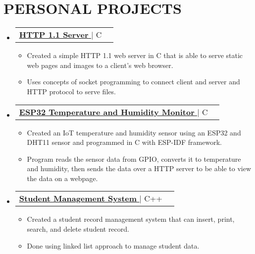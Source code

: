 \documentclass[letterpaper,11pt]{article}
\makeatletter
\newcommand{\resumeItem}[1]{
  \item\small{
    {#1 \vspace{-2pt}}
  }
}
\newcommand{\resumeProjectHeading}[2]{
    \item
    \begin{tabular*}{1.001\textwidth}{l@{\extracolsep{\fill}}r}
      \small#1 & \textbf{\small #2}\\
    \end{tabular*}\vspace{-7pt}
}
\newcommand{\resumeSubHeadingListStart}{\begin{itemize}[leftmargin=0.0in, label={}]}
\newcommand{\resumeSubHeadingListEnd}{\end{itemize}}
\newcommand{\resumeItemListStart}{\begin{itemize}}
\newcommand{\resumeItemListEnd}{\end{itemize}\vspace{-5pt}}
\makeatother
\begin{document}
\section{PERSONAL PROJECTS}
    \resumeSubHeadingListStart
      \resumeProjectHeading
        {\href{https://github.com/jamesyoung-15/http-server}{\textbf{\large{\underline{HTTP 1.1 Server}}} \href{Project Link}{\raisebox{-0.1\height}\faExternalLink }} $|$ \large{{C}}}{}
        \resumeItemListStart
        \vspace{3pt}
          \resumeItem{\normalsize{Created a simple HTTP 1.1 web server in C that is able to serve static web pages and images to a client's web browser.}}
          \resumeItem{\normalsize{Uses concepts of socket programming to connect client and server and HTTP protocol to serve files.}}
          \resumeItemListEnd
      
      \resumeProjectHeading
      {\href{https://github.com/jamesyoung-15/esp32-dht11-server}{\textbf{\large{\underline{ESP32 Temperature and Humidity Monitor}}} \href{Project Link}{\raisebox{-0.1\height}\faExternalLink }} $|$ \large{{C}}}{}
      \resumeItemListStart
      \vspace{3pt}
        \resumeItem{\normalsize{Created an IoT temperature and humidity sensor using an ESP32 and DHT11 sensor and programmed in C with ESP-IDF framework.}}
        \resumeItem{\normalsize{Program reads the sensor data from GPIO, converts it to temperature and humidity, then sends the data over a HTTP server to be able to view the data on a webpage.}}
      \resumeItemListEnd

      \resumeProjectHeading
      {\href{https://github.com/jamesyoung-15/cpp_practice/tree/main/Student_Management}{\textbf{\large{\underline{Student Management System}}} \href{Project Link}{\raisebox{-0.1\height}\faExternalLink }} $|$ \large{{C++}}}{}
      \resumeItemListStart
      \vspace{3pt}
        \resumeItem{\normalsize{Created a student record management system that can insert, print, search, and delete student record.}}
        \resumeItem{\normalsize{Done using linked list approach to manage student data.}}
      \resumeItemListEnd 
          
          \resumeSubHeadingListEnd
\vspace{3pt}

%


\end{document}
